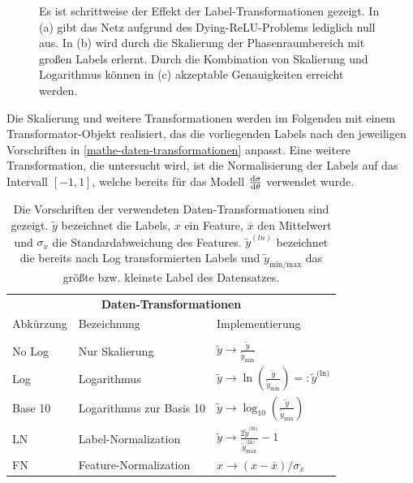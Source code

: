 \begin{figure}[ht]
	\captionsetup{justification=justified}
	\caption{Es ist schrittweise der Effekt der Label-Transformationen gezeigt. In (a) gibt das Netz aufgrund des Dying-ReLU-Problems lediglich null aus. In (b) wird durch die Skalierung der Phasenraumbereich mit großen Labels erlernt. Durch die Kombination von Skalierung und Logarithmus können in (c) akzeptable Genauigkeiten erreicht werden.} 
	\label{DyingReluAction}
\end{figure}

Die Skalierung und weitere Transformationen werden im Folgenden mit einem Transformator-Objekt realisiert, das die vorliegenden Labels nach den jeweiligen Vorschriften in \textsf{\autoref{mathe-daten-transformationen}} anpasst. Eine weitere Transformation, die untersucht wird, ist die Normalisierung der Labels auf das Intervall $[-1, 1]$, welche bereits für das Modell $\derivative{\sigma}{\theta}$ verwendet wurde.
\begin{table}
	\centering
	\captionsetup{justification=justified}
	\caption{Die Vorschriften der verwendeten Daten-Transformationen sind gezeigt. $\tilde{y}$ bezeichnet die Labels, $x$ ein Feature, $\overline{x}$ den Mittelwert und $\sigma_x$ die Standardabweichung des Features. $\tilde{y}^{(ln)}$ bezeichnet die bereits nach Log transformierten Labels und $\tilde{y}_{\text{min/max}}$ das größte bzw. kleinste Label des Datensatzes.}
	\begin{tabular}{lll}
		\multicolumn{3}{c}{\textbf{Daten-Transformationen}} \\[5pt]
		Abkürzung & Bezeichnung & Implementierung \\
		\hline\\[-10pt]
		No Log & Nur Skalierung & $\tilde{y} \rightarrow \frac{\tilde{y}}{\tilde{y}_{\text{min}}}$ \\
		Log & Logarithmus & $\tilde{y} \rightarrow \ln(\frac{\tilde{y}}{\tilde{y}_{\text{min}}}) =: \tilde{y}^{\text{(ln)}}$ \\
		Base 10 & Logarithmus zur Basis 10 & $\tilde{y} \rightarrow \log_{10}(\frac{\tilde{y}}{\tilde{y}_{\text{min}}})$ \\
		LN & Label-Normalization & $\tilde{y} \rightarrow \frac{2\tilde{y}^{\text{(ln)}}}{\tilde{y}^{\text{(ln)}}_{\text{max}}} - 1$\\
		FN \cite{FN} & Feature-Normalization & $x \rightarrow {(x - \overline{x})}/{\sigma_x}$ \\
		\hline
	\end{tabular}
	\label{mathe-daten-transformationen}
\end{table}

